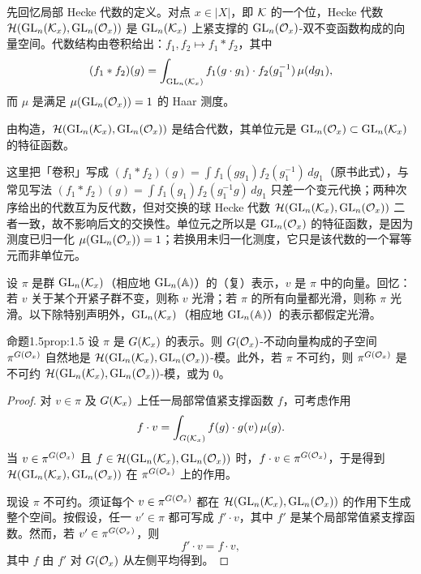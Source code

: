 先回忆局部 Hecke 代数的定义。对点 $x\in|X|$，即 $\mathcal{K}$ 的一个位，Hecke 代数 $\mathcal{H}(\mathrm{GL}_n(\mathcal{K}_x),\mathrm{GL}_n(\mathcal{O}_x))$ 是 $\mathrm{GL}_n(\mathcal{K}_x)$ 上紧支撑的 $\mathrm{GL}_n(\mathcal{O}_x)$-双不变函数构成的向量空间。代数结构由卷积给出：$f_1,f_2\mapsto f_1*f_2$，其中
\[
(f_1*f_2)(g)=\int_{\mathrm{GL}_n(\mathcal{K}_x)}f_1(g\cdot g_1)\cdot f_2(g_1^{-1})\,\mu(dg_1),
\]
而 $\mu$ 是满足 $\mu(\mathrm{GL}_n(\mathcal{O}_x))=1$ 的 Haar 测度。

由构造，$\mathcal{H}(\mathrm{GL}_n(\mathcal{K}_x),\mathrm{GL}_n(\mathcal{O}_x))$ 是结合代数，其单位元是 $\mathrm{GL}_n(\mathcal{O}_x)\subset\mathrm{GL}_n(\mathcal{K}_x)$ 的特征函数。

\begin{annote}
这里把「卷积」写成 $(f_1*f_2)(g)=\int f_1(g g_1)f_2(g_1^{-1})\,dg_1$（原书此式），与常见写法 $(f_1*f_2)(g)=\int f_1(g_1)f_2(g_1^{-1}g)\,dg_1$ 只差一个变元代换；两种次序给出的代数互为反代数，但对交换的球 Hecke 代数 $\mathcal{H}(\mathrm{GL}_n(\mathcal{K}_x),\mathrm{GL}_n(\mathcal{O}_x))$ 二者一致，故不影响后文的交换性。单位元之所以是 $\mathrm{GL}_n(\mathcal{O}_x)$ 的特征函数，是因为测度已归一化 $\mu(\mathrm{GL}_n(\mathcal{O}_x))=1$；若换用未归一化测度，它只是该代数的一个幂等元而非单位元。
\par\vspace{0.15em}{\raggedleft 【来源：本书第 6 章 §1 对局部紧群卷积与光滑表示的约定；Cassels--Fr\"ohlich《Algebraic Number Theory》第 II 章（A）】\par}
\end{annote}

设 $\pi$ 是群 $\mathrm{GL}_n(\mathcal{K}_x)$（相应地 $\mathrm{GL}_n(\mathbb{A})$）的（复）表示，$v$ 是 $\pi$ 中的向量。回忆：若 $v$ 关于某个开紧子群不变，则称 $v$ 光滑；若 $\pi$ 的所有向量都光滑，则称 $\pi$ 光滑。以下除特别声明外，$\mathrm{GL}_n(\mathcal{K}_x)$（相应地 $\mathrm{GL}_n(\mathbb{A})$）的表示都假定光滑。

\begin{othm}{命题}{1.5}{prop:1.5}
设 $\pi$ 是 $G(\mathcal{K}_x)$ 的表示。则 $G(\mathcal{O}_x)$-不动向量构成的子空间 $\pi^{G(\mathcal{O}_x)}$ 自然地是 $\mathcal{H}(\mathrm{GL}_n(\mathcal{K}_x),\mathrm{GL}_n(\mathcal{O}_x))$-模。此外，若 $\pi$ 不可约，则 $\pi^{G(\mathcal{O}_x)}$ 是不可约 $\mathcal{H}(\mathrm{GL}_n(\mathcal{K}_x),\mathrm{GL}_n(\mathcal{O}_x))$-模，或为 $0$。
\end{othm}

\begin{proof}
对 $v\in\pi$ 及 $G(\mathcal{K}_x)$ 上任一局部常值紧支撑函数 $f$，可考虑作用
\[
f\cdot v=\int_{G(\mathcal{K}_x)}f(g)\cdot g(v)\,\mu(g).
\]
当 $v\in\pi^{G(\mathcal{O}_x)}$ 且 $f\in\mathcal{H}(\mathrm{GL}_n(\mathcal{K}_x),\mathrm{GL}_n(\mathcal{O}_x))$ 时，$f\cdot v\in\pi^{G(\mathcal{O}_x)}$，于是得到 $\mathcal{H}(\mathrm{GL}_n(\mathcal{K}_x),\mathrm{GL}_n(\mathcal{O}_x))$ 在 $\pi^{G(\mathcal{O}_x)}$ 上的作用。

现设 $\pi$ 不可约。须证每个 $v\in\pi^{G(\mathcal{O}_x)}$ 都在 $\mathcal{H}(\mathrm{GL}_n(\mathcal{K}_x),\mathrm{GL}_n(\mathcal{O}_x))$ 的作用下生成整个空间。按假设，任一 $v'\in\pi$ 都可写成 $f'\cdot v$，其中 $f'$ 是某个局部常值紧支撑函数。然而，若 $v'\in\pi^{G(\mathcal{O}_x)}$，则
\[
f'\cdot v=f\cdot v,
\]
其中 $f$ 由 $f'$ 对 $G(\mathcal{O}_x)$ 从左侧平均得到。
\end{proof}

